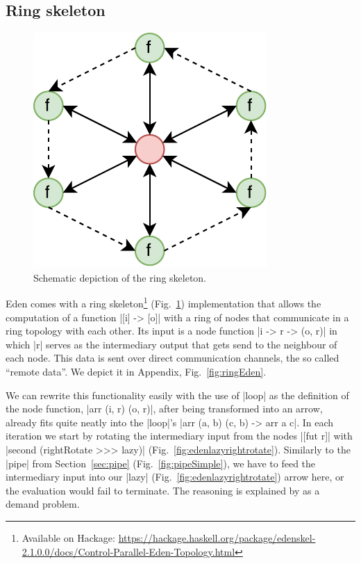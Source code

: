 \subsection{Ring skeleton} \label{sec:ring}
\begin{figure}[tb]
	\includegraphics[scale=0.75]{images/ring}
	\caption{Schematic depiction of the ring skeleton.}
	\label{fig:ringImg}
\end{figure}
Eden comes with a ring skeleton\footnote{Available on Hackage: \url{https://hackage.haskell.org/package/edenskel-2.1.0.0/docs/Control-Parallel-Eden-Topology.html}} (Fig.~\ref{fig:ringImg}) implementation that allows the computation of a function |[i] -> [o]| with a ring of nodes that communicate in a ring topology with each other. Its input is a node function |i -> r -> (o, r)| in which |r| serves as the intermediary output that gets send to the neighbour of each node. This data is sent over direct communication channels, the so called \enquote{remote data}. We depict it in Appendix, Fig.~\ref{fig:ringEden}.


We can rewrite this functionality easily with the use of |loop| as the definition of the node function, |arr (i, r) (o, r)|, after being transformed into an arrow, already fits quite neatly into the |loop|'s |arr (a, b) (c, b) -> arr a c|. In each iteration we start by rotating the intermediary input from the nodes |[fut r]| with |second (rightRotate >>> lazy)| (Fig.~\ref{fig:edenlazyrightrotate}). Similarly to the |pipe| from Section~\ref{sec:pipe} (Fig.~\ref{fig:pipeSimple}), we have to feed the intermediary input into our |lazy| (Fig.~\ref{fig:edenlazyrightrotate}) arrow here, or the evaluation would fail to terminate. The reasoning is explained by \citet{Loogen2012} as a demand problem.

